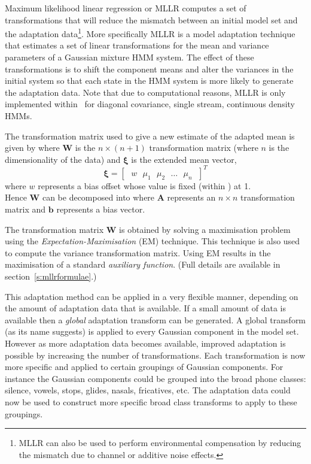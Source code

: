 Maximum likelihood linear regression or MLLR
computes a set of transformations that will reduce the mismatch
between an initial model set and the adaptation data\footnote{
MLLR can also be used to perform environmental compensation by
reducing the mismatch due to channel or additive noise effects.}.
More specifically MLLR is a model adaptation technique
that estimates a set of linear transformations for the mean and
variance parameters of a Gaussian mixture HMM system. 
The effect of these transformations is to shift the
component means and alter the variances in the initial system 
so that each state in the HMM system is more likely to generate the 
adaptation data.
Note that due to computational reasons, MLLR is only implemented
within \HTK\ for diagonal covariance, single stream, continuous density
HMMs.

The transformation matrix used to give a new estimate of the adapted mean is
given by
where $\bm{W}$ is the $n \times \left( n + 1 \right)$
transformation matrix (where $n$ is the dimensionality of the data)
and $\bm{\xi}$ is the extended mean vector,
\[
        \bm{\xi} = \left[\mbox{ }w\mbox{ }\mu_1\mbox{ }\mu_2\mbox{ }\dots\mbox{ }\mu_n\mbox{ }\right]^T
\]
where $w$ represents a bias offset whose value is fixed (within \HTK) at 1.\\
Hence $\bm{W}$ can be decomposed into
where $\bm{A}$ represents an $n \times n$
transformation matrix and $\bm{b}$ represents a bias vector.

The transformation matrix $\bm{W}$ is obtained by solving a
maximisation problem using the \textit{Expectation-Maximisation}
(EM) technique. This technique is also used to compute the variance
transformation matrix. Using EM results in the maximisation of a
standard \textit{auxiliary function}. (Full details are available in
section~\ref{s:mllrformulae}.)

This adaptation method can be applied in a very flexible manner,
depending on the amount of adaptation data that is available. If a
small amount of data is available then a \textit{global} adaptation transform 
 can be generated. A global transform 
(as its name suggests) is applied
to every Gaussian component in the model set. However as more
adaptation data becomes available, improved adaptation is possible by
increasing the number of transformations. Each transformation is now
more specific and applied to certain groupings of Gaussian components.
For instance the Gaussian components could be grouped into the broad 
phone classes: silence, vowels, stops, glides, nasals, fricatives, etc.
The adaptation data could now be used to construct more specific broad
class transforms to apply to these groupings.

